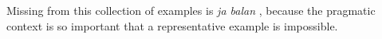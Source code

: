  Missing from this collection of examples is \textit{ja balan} , because the pragmatic context is so important that a representative example is impossible. 
 
% 

